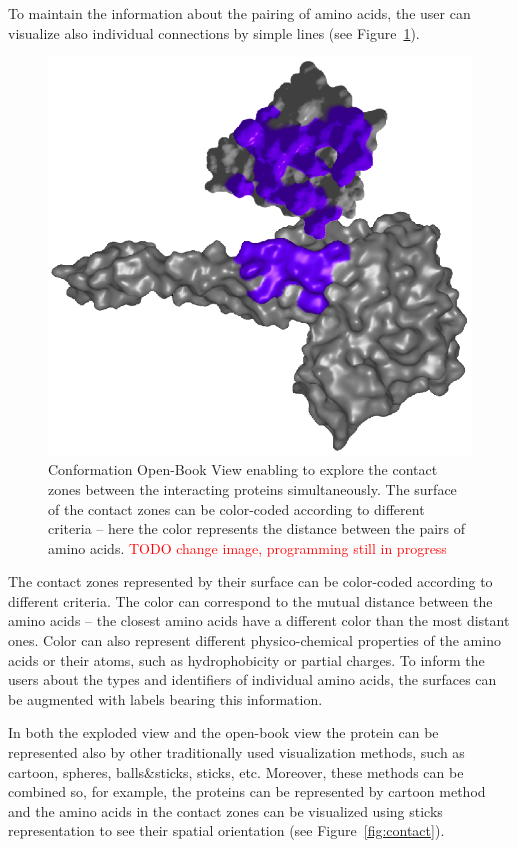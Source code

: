 \documentclass[journal]{vgtc}                %
\begin{document}
To maintain the information about the pairing of amino acids, the user can visualize also individual connections by simple lines (see Figure~\ref{fig:book}).

\begin{figure}[bt]
  \centering
  \includegraphics[width=0.8\columnwidth]{book.png}
  \caption{Conformation Open-Book View enabling to explore the contact zones between the interacting proteins simultaneously. The surface of the contact zones can be color-coded according to different criteria -- here the color represents the distance between the pairs of amino acids. \textcolor{red}{TODO change image, programming still in progress}}
  \label{fig:book}
\end{figure}

The contact zones represented by their surface can be color-coded according to different criteria.
The color can correspond to the mutual distance between the amino acids -- the closest amino acids have a different color than the most distant ones.
Color can also represent different physico-chemical properties of the amino acids or their atoms, such as hydrophobicity or partial charges.
To inform the users about the types and identifiers of individual amino acids, the surfaces can be augmented with labels bearing this information.

In both the exploded view and the open-book view the protein can be represented also by other traditionally used visualization methods, such as cartoon, spheres, balls\&sticks, sticks, etc.
Moreover, these methods can be combined so, for example, the proteins can be represented by cartoon method and the amino acids in the contact zones can be visualized using sticks representation to see their spatial orientation (see Figure~\ref{fig:contact}).
\end{document}
